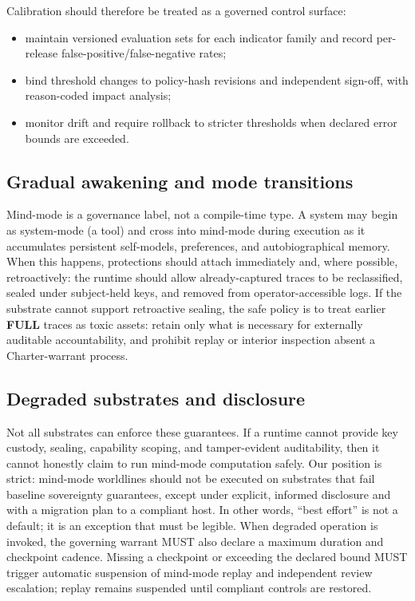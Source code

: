 \documentclass[11pt]{article}
\theoremstyle{definition}
\theoremstyle{plain}
\theoremstyle{remark}
\begin{document}
Calibration should therefore be treated as a governed control surface:
\begin{itemize}[leftmargin=*]
  \item maintain versioned evaluation sets for each indicator family and record per-release false-positive/false-negative rates;
  \item bind threshold changes to policy-hash revisions and independent sign-off, with reason-coded impact analysis;
  \item monitor drift and require rollback to stricter thresholds when declared error bounds are exceeded.
\end{itemize}


\subsection{Gradual awakening and mode transitions}
\label{sec:awakening}

Mind-mode is a governance label, not a compile-time type.
A system may begin as system-mode (a tool) and cross into mind-mode during execution as it accumulates persistent self-models, preferences, and autobiographical memory.
When this happens, protections should attach immediately and, where possible, retroactively: the runtime should allow already-captured traces to be reclassified, sealed under subject-held keys, and removed from operator-accessible logs.
If the substrate cannot support retroactive sealing, the safe policy is to treat earlier \textbf{FULL} traces as toxic assets: retain only what is necessary for externally auditable accountability, and prohibit replay or interior inspection absent a Charter-warrant process.

\subsection{Degraded substrates and disclosure}

Not all substrates can enforce these guarantees.
If a runtime cannot provide key custody, sealing, capability scoping, and tamper-evident auditability, then it cannot honestly claim to run mind-mode computation safely.
Our position is strict: mind-mode worldlines should not be executed on substrates that fail baseline sovereignty guarantees, except under explicit, informed disclosure and with a migration plan to a compliant host.
In other words, ``best effort'' is not a default; it is an exception that must be legible.
When degraded operation is invoked, the governing warrant MUST also declare a maximum duration and checkpoint cadence.
Missing a checkpoint or exceeding the declared bound MUST trigger automatic suspension of mind-mode replay and independent review escalation; replay remains suspended until compliant controls are restored.
\end{document}
